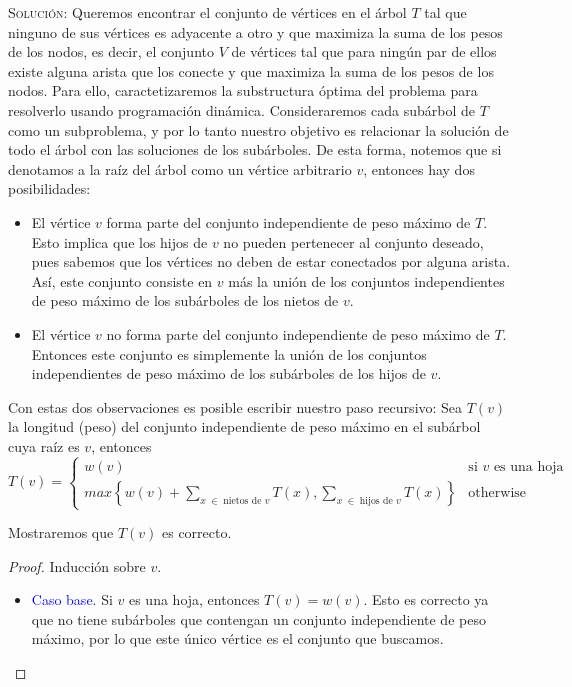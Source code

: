 \documentclass[letterpaper,11pt]{article}
\begin{document}
\begin{enumerate}
    \textsc{Solución:} Queremos encontrar el conjunto de vértices en el árbol 
    $T$ tal que ninguno de sus vértices es adyacente a otro y que maximiza la 
    suma de los pesos de los nodos, es decir, el conjunto $V$ de vértices tal 
    que para ningún par de ellos existe alguna arista que los conecte y que 
    maximiza la suma de los pesos de los nodos. Para ello, caractetizaremos la 
    substructura óptima del problema para resolverlo usando programación 
    dinámica. Consideraremos cada subárbol de $T$ como un subproblema, y por 
    lo tanto nuestro objetivo es relacionar la solución de todo el árbol con 
    las soluciones de los subárboles. De esta forma, notemos que si denotamos 
    a la raíz del árbol como un vértice arbitrario $v$, entonces hay dos 
    posibilidades:
    \begin{itemize}
        \item El vértice $v$ forma parte del conjunto independiente de peso 
        máximo de $T$. Esto implica que los hijos de $v$ no pueden pertenecer 
        al conjunto deseado, pues sabemos que los vértices no deben de estar 
        conectados por alguna arista. Así, este conjunto consiste en $v$ más 
        la unión de los conjuntos independientes de peso máximo de los 
        subárboles de los nietos de $v$.

        \item El vértice $v$ no forma parte del conjunto independiente de peso 
        máximo de $T$. Entonces este conjunto es simplemente la unión de los 
        conjuntos independientes de peso máximo de los subárboles de los hijos 
        de $v$. 
    \end{itemize} 

    Con estas dos observaciones es posible escribir nuestro paso recursivo: Sea 
    $T(v)$ la longitud (peso) del conjunto independiente de peso máximo en el 
    subárbol cuya raíz es $v$, entonces 
    \begin{equation*}
        T(v) = 
        \begin{cases}
            w(v) & \text{si $v$ es una hoja} \\
            max \left\{w(v) + \sum_{x \; \in \; \text{nietos de $v$}} 
            T(x), \sum_{x \; \in \; \text{hijos de $v$}} T(x) \right\} 
            & \text{otherwise}
        \end{cases}
    \end{equation*}

    Mostraremos que $T(v)$ es correcto.
    \begin{proof}
        Inducción sobre $v$. 
        \begin{itemize}
            \item \textcolor{blue}{Caso base}. Si $v$ es una hoja, entonces 
            $T(v) = w(v)$. Esto es correcto ya que no tiene subárboles que 
            contengan un conjunto independiente de peso máximo, por lo que 
            este único vértice es el conjunto que buscamos. 


\end{itemize}
\end{proof}
\end{enumerate}
\end{document}
